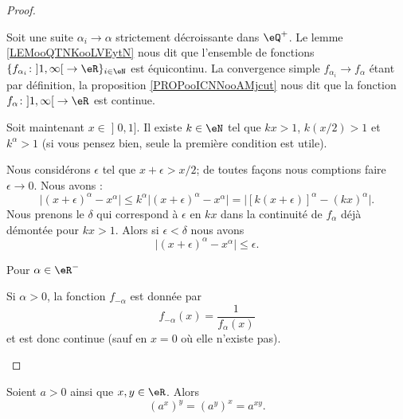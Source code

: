 \begin{proof}
\begin{subproof}
            Soit une suite \( \alpha_i\to \alpha\) strictement décroissante dans \( \eQ^+\). Le lemme \ref{LEMooQTNKooLVEytN} nous dit que l'ensemble de fonctions  \( \{ f_{\alpha_i}\colon \mathopen] 1 , \infty \mathclose[\to \eR \}_{i\in \eN}\) est équicontinu. La convergence simple \( f_{\alpha_i}\to f_{\alpha}\) étant par définition, la proposition \ref{PROPooICNNooAMjcut} nous dit que la fonction \( f_{\alpha}\colon \mathopen] 1 , \infty \mathclose[\to \eR\) est continue.

            Soit maintenant \( x\in \mathopen] 0 , 1 \mathclose]\). Il existe \( k\in \eN\) tel que \( kx>1\), \( k(x/2)>1\) et \( k^{\alpha}>1\) (si vous pensez bien, seule la première condition est utile).

            Nous considérons \( \epsilon\) tel que \( x+\epsilon>x/2\); de toutes façons nous comptions faire \( \epsilon\to 0\). Nous avons :
            \begin{equation}
                \big| (x+\epsilon)^{\alpha}-x^{\alpha} \big|\leq k^{\alpha}\big| (x+\epsilon)^{\alpha}-x^{\alpha} \big|=\big| [k(x+\epsilon)]^{\alpha}-(kx)^{\alpha} \big|.
            \end{equation}
            Nous prenons le \( \delta\) qui correspond à \( \epsilon\) en \( kx\) dans la continuité de \( f_{\alpha}\) déjà démontée pour \( kx>1\). Alors si \( \epsilon<\delta\) nous avons
            \begin{equation}
                \big| (x+\epsilon)^{\alpha}-x^{\alpha} \big|\leq\epsilon.
            \end{equation}
        \item[Pour \( \alpha\in \eR^{-}\)]

            Si \( \alpha>0\), la fonction \( f_{-\alpha}\) est donnée par
            \begin{equation}
                f_{-\alpha}(x)=\frac{1}{  f_{\alpha}(x) }
            \end{equation}
            et est donc continue (sauf en \( x=0\) où elle n'existe pas).
    \end{subproof}
\end{proof}

\begin{proposition}     \label{PROPooDWZKooNwXsdV}
    Soient \( a>0\) ainsi que \( x,y\in \eR\). Alors
    \begin{equation}
        (a^x)^y=(a^y)^x=a^{xy}.
    \end{equation}
\end{proposition}

